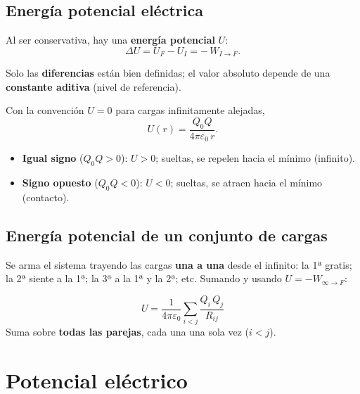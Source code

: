 \documentclass[12pt,a4paper]{article}
\begin{document}
\subsection{Energía potencial eléctrica}

Al ser conservativa, hay una \textbf{energía potencial} $U$:
\[
\Delta U = U_F - U_I = -\,W_{I\to F}.
\]

Solo las \textbf{diferencias} están bien definidas; el valor absoluto
depende de una \textbf{constante aditiva} (nivel de referencia).

\begin{keybox}
  Con la convención $U=0$ para cargas infinitamente alejadas,
  \[
  \boxed{U(r) = \frac{Q_0 Q}{4\pi\varepsilon_0\, r}} .
  \]
\end{keybox}

\begin{itemize}[nosep]
  \item \textbf{Igual signo} ($Q_0 Q>0$): $U>0$; sueltas, se repelen
        hacia el mínimo (infinito).
  \item \textbf{Signo opuesto} ($Q_0 Q<0$): $U<0$; sueltas, se atraen
        hacia el mínimo (contacto).
\end{itemize}



\subsection{Energía potencial de un conjunto de cargas}

Se arma el sistema trayendo las cargas \textbf{una a una} desde el
infinito: la 1ª gratis; la 2ª siente a la 1ª; la 3ª a la 1ª y la 2ª;
etc. Sumando y usando $U=-W_{\infty\to F}$:

\begin{keybox}
  \[
  \boxed{U = \frac{1}{4\pi\varepsilon_0}\sum_{i<j}\frac{Q_i\,Q_j}{R_{ij}}}
  \]
  Suma sobre \textbf{todas las parejas}, cada una una sola vez
  ($i<j$).
\end{keybox}

\section{Potencial eléctrico}
\end{document}

